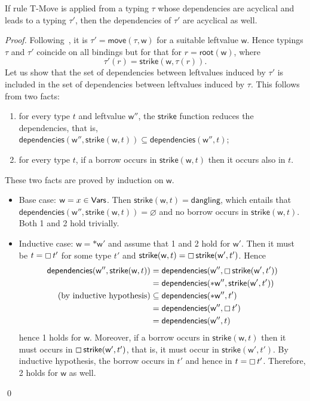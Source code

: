 \begin{lemma}\label{lem:move_imvariant}
  If rule \textsf{T-Move} is applied from a typing $\tau$ whose dependencies
  are acyclical and leads to a typing $\tau'$, then the dependencies
  of $\tau'$ are acyclical as well.
\end{lemma}
\begin{proof}
  Following~\cite{Pearce21}, it is $\tau'=\mathsf{move}(\tau,\mathsf{w})$
  for a suitable
  leftvalue $\mathsf{w}$. Hence typings $\tau$ and $\tau'$ coincide
  on all bindings but for that for $r=\mathsf{root}(\mathsf{w})$, where
  \[
  \tau'(r)=\mathsf{strike}(\mathsf{w},\tau(r)).
  \]
  Let us show that the set of dependencies between leftvalues induced
  by $\tau'$ is included in the set of dependencies between leftvalues
  induced by $\tau$. This follows from two facts:
  \begin{enumerate}
  \item for every type $t$ and leftvalue $\mathsf{w}''$, the $\mathsf{strike}$
    function reduces the dependencies, that is,
    $\mathsf{dependencies}(\mathsf{w}'',\mathsf{strike}(\mathsf{w},t))
    \subseteq\mathsf{dependencies}(\mathsf{w}'',t)$;
  \item for every type $t$, if a borrow occurs in
    $\mathsf{strike}(\mathsf{w},t)$ then it occurs also in $t$.
  \end{enumerate}
  These two facts are proved by induction on $\mathsf{w}$.
  \begin{itemize}
  \item Base case: $\mathsf{w}=x\in\mathsf{Vars}$. Then $\mathsf{strike}(\mathsf{w},t)
    =\mathsf{dangling}$,
    which entails that $\mathsf{dependencies}
    (\mathsf{w}'',\mathsf{strike}(\mathsf{w},t))=\varnothing$ and no borrow
    occurs in $\mathsf{strike}(\mathsf{w},t)$. Both 1 and 2 hold trivially.
  \item Inductive case: $\mathsf{w}=\mathtt{*}\mathsf{w}'$ and assume that
    1 and 2 hold for $\mathsf{w}'$. Then it must be $t=\boxempty\,{t'}$
    for some type $t'$ and $\mathsf{strike}(\mathsf{w},t)
    =\boxempty\,{\mathsf{strike}(\mathsf{w}',t')}$. Hence
    \begin{align*}
      \mathsf{dependencies}(\mathsf{w}'',\mathsf{strike}(\mathsf{w},t))&=
      \mathsf{dependencies}(\mathsf{w}'',\boxempty\,{\mathsf{strike}(\mathsf{w}',t')})\\
      &=\mathsf{dependencies}(\mathtt{*}\mathsf{w}'',\mathsf{strike}(\mathsf{w}',t'))\\
      \text{(by inductive hypothesis)}&\subseteq
      \mathsf{dependencies}(\mathtt{*}\mathsf{w}'',t')\\
      &=\mathsf{dependencies}(\mathsf{w}'',\boxempty\,{t'})\\
      &=\mathsf{dependencies}(\mathsf{w}'',t)
    \end{align*}
    hence 1 holds for $\mathsf{w}$. Moreover, if a borrow occurs in
    $\mathsf{strike}(\mathsf{w},t)$ then it must occurs
    in $\boxempty\,{\mathsf{strike}(\mathsf{w}',t')}$, that is, it must occur in
    $\mathsf{strike}(\mathsf{w}',t')$. By inductive hypothesis, the borrow
    occurs in $t'$ and hence in $t=\boxempty\,{t'}$. Therefore, 2 holds for
    $\mathsf{w}$ as well.
  \end{itemize}
  \qed
\end{proof}
